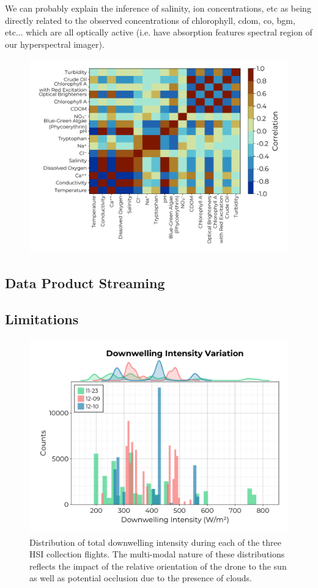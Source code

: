 \documentclass[journal,article,submit,pdftex,moreauthors]{Definitions/mdpi}
\begin{document}
We can probably explain the inference of salinity, ion concentrations, etc as being directly related to the observed concentrations of chlorophyll, cdom, co, bgm, etc... which are all optically active (i.e. have absorption features spectral region of our hyperspectral imager).

\begin{figure}[H]
\includegraphics[width=10.5 cm]{paper/figures/results/target_correlations.pdf}
\caption{\label{fig:target-correlations}}
\end{figure}   



\subsection{Data Product Streaming}

\subsection{Limitations}

\begin{figure}[H]
\includegraphics[width=10.5 cm]{paper/figures/results/downwelling-hist.pdf}
\caption{Distribution of total downwelling intensity during each of the three HSI collection flights. The multi-modal nature of these distributions reflects the impact of the relative orientation of the drone to the sun as well as potential occlusion due to the presence of clouds.\label{fig:downwelling-hist}}
\end{figure}   
\end{document}
